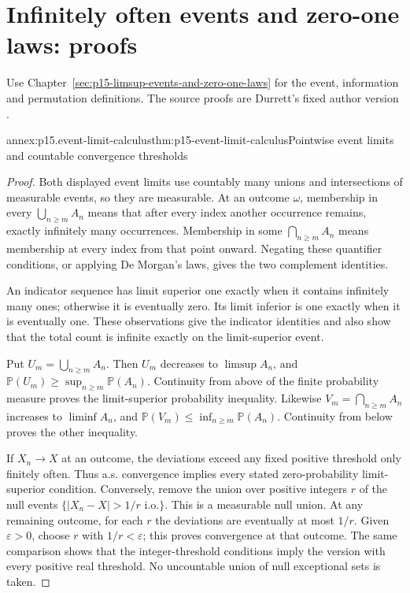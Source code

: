 \section{Infinitely often events and zero-one laws: proofs}
\label{sec:annex-p15-limsup-events-and-zero-one-laws}

Use Chapter~\ref{sec:p15-limsup-events-and-zero-one-laws} for the event,
information and permutation definitions. The source proofs are Durrett's
fixed author version \cite[pp.~67--72, 81--83]{DurrettPTEAuthor2019}.

\begin{annexitem}{annex:p15.event-limit-calculus}{thm:p15-event-limit-calculus}{Pointwise event limits and countable convergence thresholds}
\begin{proof}
Both displayed event limits use countably many unions and intersections
of measurable events, so they are measurable. At an outcome \(\omega\),
membership in every \(\bigcup_{n\geq m}A_n\) means that after
every index another occurrence remains, exactly infinitely many
occurrences. Membership in some \(\bigcap_{n\geq m}A_n\) means
membership at every index from that point onward. Negating these
quantifier conditions, or applying De Morgan's laws, gives the two
complement identities.

An indicator sequence has limit superior one exactly when it contains
infinitely many ones; otherwise it is eventually zero. Its limit
inferior is one exactly when it is eventually one. These observations
give the indicator identities and also show that the total count is
infinite exactly on the limit-superior event.

Put \(U_m=\bigcup_{n\geq m}A_n\). Then \(U_m\) decreases
to \(\limsup A_n\), and
\(\mathbb P(U_m)\geq\sup_{n\geq m}\mathbb P(A_n)\).
Continuity from above of the finite probability measure proves
the limit-superior probability inequality. Likewise
\(V_m=\bigcap_{n\geq m}A_n\) increases to \(\liminf A_n\),
and \(\mathbb P(V_m)\leq\inf_{n\geq m}\mathbb P(A_n)\).
Continuity from below proves the other inequality.

If \(X_n\to X\) at an outcome, the deviations exceed any fixed
positive threshold only finitely often. Thus a.s. convergence implies
every stated zero-probability limit-superior condition. Conversely,
remove the union over positive integers \(r\) of the null events
\(\{|X_n-X|>1/r\text{ i.o.}\}\). This is a measurable null
union. At any remaining outcome, for each \(r\) the deviations
are eventually at most \(1/r\). Given \(\varepsilon>0\),
choose \(r\) with \(1/r<\varepsilon\); this proves convergence
at that outcome. The same comparison shows that the integer-threshold
conditions imply the version with every positive real threshold.
No uncountable union of null exceptional sets is taken.
\end{proof}
\end{annexitem}

